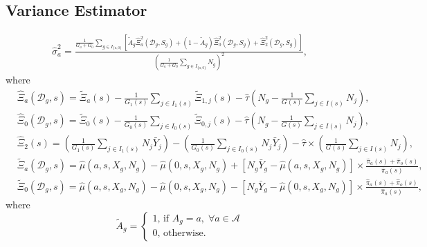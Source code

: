 \documentclass{article}
\begin{document}
\subsection*{Variance Estimator}
\begin{align}
	\hat{\sigma}_a^2 = \frac{\frac{1}{G_a + G_0} \sum_{g \in I_{\{a,0\}}}\left[\tilde{A}_g\hat{\Xi}_{a}^2(\mathcal D_g, S_g) + (1-\tilde{A}_g) \hat{\Xi}_{0}^2(\mathcal D_g, S_g) + \hat{\Xi}_2^2(\mathcal D_g, S_g) \right]}{\left(\frac{1}{G_a + G_0}\sum_{g \in I_{\{a,0\}}} N_g\right)^2}, \nonumber
\end{align}
where 
\begin{align}
	&\hat{\Xi}_{a}(\mathcal D_g, s) = \tilde{\Xi}_{a}(s) - \frac{1}{G_1(s)} \sum_{j \in I_1(s)} \tilde{\Xi}_{1,j}(s)  - \hat{\tau} \left(N_g - \frac{1}{G(s)} \sum_{j \in I(s)} N_j \right)\nonumber, \\
	&\hat{\Xi}_{0}(\mathcal D_g, s) = \tilde{\Xi}_{0}(s) - \frac{1}{G_0(s)} \sum_{j \in I_0(s)} \tilde{\Xi}_{0,j}(s)  - \hat{\tau} \left(N_g - \frac{1}{G(s)} \sum_{j \in I(s)} N_j \right)\nonumber , \\
	& \hat{\Xi}_2(s) = \left(\frac{1}{G_1(s)} \sum_{j \in I_1(s)} N_j \bar{Y}_j\right) - \left(\frac{1}{G_0(s)} \sum_{j \in I_0(s)} N_j \bar{Y}_j\right) - \hat{\tau} \times \left(\frac{1}{G(s)}\sum_{j \in I(s)} N_j \right), \nonumber \\
	&\tilde{\Xi}_{a}(\mathcal D_g, s) =\hat{\mu}(a,s,X_g,N_g) - \hat{\mu}(0,s,X_g,N_g) + \left[N_g \bar{Y}_g - \hat{\mu}(a,s,X_g,N_g)\right] \times \frac{\hat{\pi}_a(s) + \hat{\pi}_o(s)}{\hat{\pi}_a(s)}, \nonumber \\
	& \tilde{\Xi}_{0}(\mathcal D_g, s) =\hat{\mu}(a,s,X_g,N_g) - \hat{\mu}(0,s,X_g,N_g) - \left[N_g \bar{Y}_g - \hat{\mu}(0,s,X_g,N_g)\right] \times \frac{\hat{\pi}_a(s) + \hat{\pi}_o(s)}{\hat{\pi}_a(s)}, \nonumber
	\end{align}
	where 
\[\tilde{A}_g = \begin{cases}1\text{, if }A_g = a,\; \forall a \in \mathcal A \\ 0\text{, otherwise.}\end{cases}\]
\end{document}
